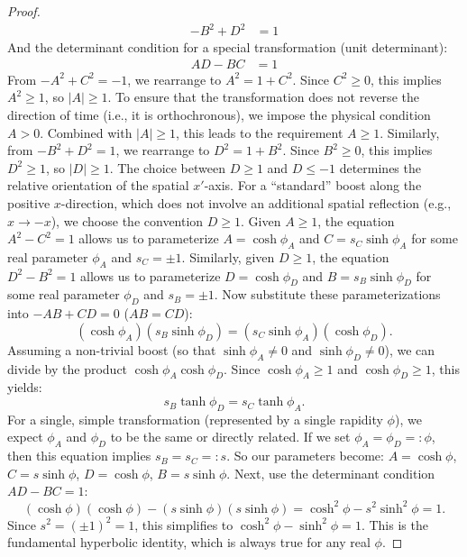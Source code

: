 \documentclass{amsart}
\theoremstyle{definition}
\theoremstyle{remark}
\begin{document}
\begin{proof}
\begin{align*}
    -B^2 + D^2 &= 1
  \end{align*}
  And the determinant condition for a special transformation (unit determinant):
  \begin{align*}
    AD-BC &= 1 
  \end{align*}
  From $-A^2 + C^2 = -1$, we rearrange to $A^2 = 1 + C^2$. Since $C^2 \geq 0$, this implies $A^2 \geq 1$, so $|A| \geq 1$. To ensure that the transformation does not reverse the direction of time (i.e., it is orthochronous), we impose the physical condition $A > 0$. Combined with $|A| \geq 1$, this leads to the requirement $A \geq 1$. Similarly, from $-B^2 + D^2 = 1$, we rearrange to $D^2 = 1 + B^2$. Since $B^2 \geq 0$, this implies $D^2 \geq 1$, so $|D| \geq 1$. The choice between $D \geq 1$ and $D \leq -1$ determines the relative orientation of the spatial $x'$-axis. For a ``standard'' boost along the positive $x$-direction, which does not involve an additional spatial reflection (e.g., $x \to -x$), we choose the convention $D \geq 1$. Given $A \geq 1$, the equation $A^2 - C^2 = 1$ allows us to parameterize $A = \cosh\phi_A$ and $C = s_C \sinh\phi_A$ for some real parameter $\phi_A$ and $s_C = \pm 1$. Similarly, given $D \geq 1$, the equation $D^2 - B^2 = 1$ allows us to parameterize $D = \cosh\phi_D$ and $B = s_B \sinh\phi_D$ for some real parameter $\phi_D$ and $s_B = \pm 1$.  Now substitute these parameterizations into $-AB + CD = 0$ ($AB = CD$):
  \begin{equation*}
    (\cosh\phi_A)(s_B \sinh\phi_D) = (s_C \sinh\phi_A)(\cosh\phi_D).
  \end{equation*}
  Assuming a non-trivial boost (so that $\sinh\phi_A \neq 0$ and $\sinh\phi_D \neq 0$), we can divide by the product $\cosh\phi_A \cosh\phi_D$. Since $\cosh\phi_A \ge 1$ and $\cosh\phi_D \ge 1$, this yields:
  \begin{equation*}
    s_B \tanh\phi_D = s_C \tanh\phi_A.
  \end{equation*}
  For a single, simple transformation (represented by a single rapidity $\phi$), we expect $\phi_A$ and $\phi_D$ to be the same or directly related. If we set $\phi_A = \phi_D =: \phi$, then this equation implies $s_B = s_C =: s$.
  So our parameters become: $A = \cosh\phi$, $C = s \sinh\phi$, $D = \cosh\phi$, $B = s \sinh\phi$.  Next, use the determinant condition $AD-BC=1$:
  \begin{equation*}
    (\cosh\phi)(\cosh\phi) - (s \sinh\phi)(s \sinh\phi) = \cosh^2\phi - s^2 \sinh^2\phi = 1.
  \end{equation*}
  Since $s^2 = (\pm 1)^2 = 1$, this simplifies to $\cosh^2\phi - \sinh^2\phi = 1$. This is the fundamental hyperbolic identity, which is always true for any real $\phi$.

\end{proof}
\end{document}
